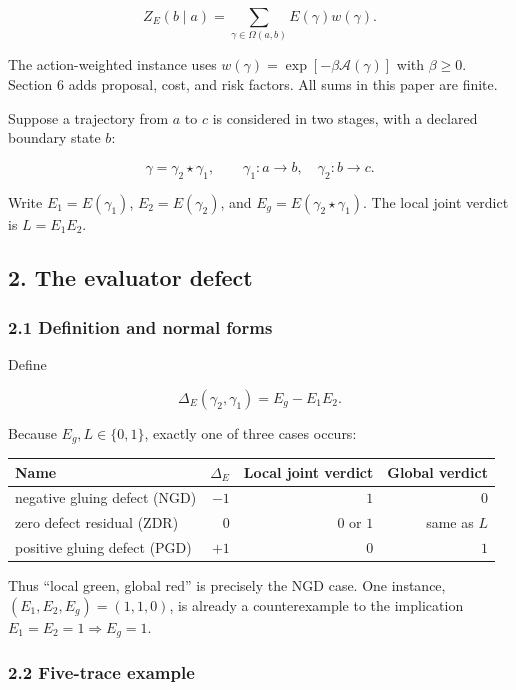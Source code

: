 \documentclass[
  11pt,
]{article}
\theoremstyle{plain}
\theoremstyle{definition}\newtheorem{definition}[theorem]{Definition}
\theoremstyle{remark}\newtheorem*{remark}{Remark}
\begin{document}
\[
Z_E(b\mid a)
  =\sum_{\gamma\in\Omega(a,b)}E(\gamma)w(\gamma).
\]

The action-weighted instance uses
\(w(\gamma)=\exp[-\beta\mathcal A(\gamma)]\) with \(\beta\ge0\).
Section 6 adds proposal, cost, and risk factors. All sums in this paper are
finite.

Suppose a trajectory from \(a\) to \(c\) is considered in two stages, with a
declared boundary state \(b\):

\[
\gamma=\gamma_2\star\gamma_1,\qquad
\gamma_1:a\to b,\quad\gamma_2:b\to c.
\]

Write \(E_1=E(\gamma_1)\), \(E_2=E(\gamma_2)\), and
\(E_g=E(\gamma_2\star\gamma_1)\). The local joint verdict is
\(L=E_1E_2\).

\subsection{2. The evaluator defect}\label{the-evaluator-defect}

\subsubsection{2.1 Definition and normal forms}\label{definition-and-normal-forms}

Define

\[
\Delta_E(\gamma_2,\gamma_1)=E_g-E_1E_2.
\]

Because \(E_g,L\in\{0,1\}\), exactly one of three cases occurs:

\begin{longtable}[]{@{}lrrr@{}}
\toprule\noalign{}
Name & \(\Delta_E\) & Local joint verdict & Global verdict \\
\midrule\noalign{}
\endhead
\bottomrule\noalign{}
\endlastfoot
negative gluing defect (NGD) & \(-1\) & \(1\) & \(0\) \\
zero defect residual (ZDR) & \(0\) & \(0\) or \(1\) & same as \(L\) \\
positive gluing defect (PGD) & \(+1\) & \(0\) & \(1\) \\
\end{longtable}

Thus ``local green, global red'' is precisely the NGD case. One instance,
\((E_1,E_2,E_g)=(1,1,0)\), is already a counterexample to the implication
\(E_1=E_2=1\Rightarrow E_g=1\).

\subsubsection{2.2 Five-trace example}\label{five-trace-example}
\end{document}
